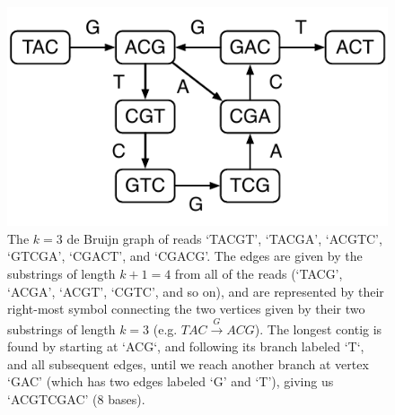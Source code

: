 

\begin{figure}
	\begin{center}
		\includegraphics[scale=0.8]{images/dbg.pdf}
		\caption{The $k=3$ de Bruijn graph of reads `TACGT', `TACGA', `ACGTC', `GTCGA', `CGACT', and
			`CGACG'. The edges are given by the substrings of length $k+1=4$ from all of the reads (`TACG', `ACGA', `ACGT', `CGTC', and so on), and are represented by their right-most symbol connecting the two vertices  given by their two substrings of length $k=3$ (e.g. $TAC \xrightarrow{G} ACG$). The longest contig is found by starting at `ACG`, and following its branch labeled `T`, and all subsequent edges, until we reach another branch at vertex `GAC' (which has two edges labeled `G' and `T'), giving us `ACGTCGAC' ($8$ bases).}
		\label{figure:dbg}
	\end{center}
\end{figure}

